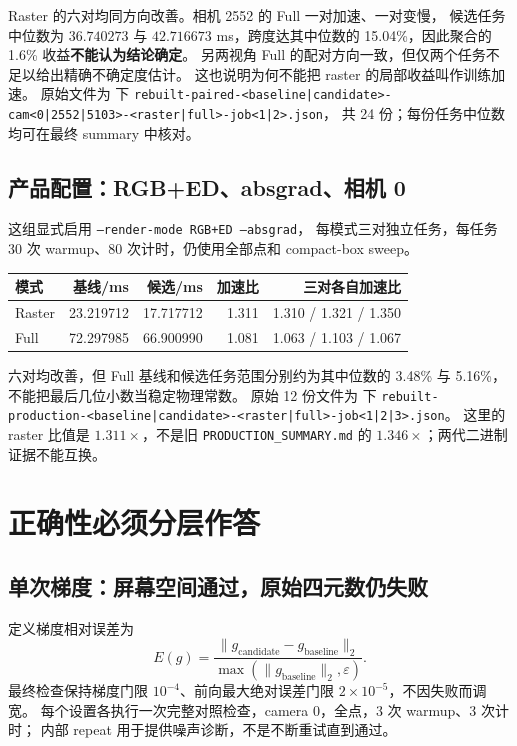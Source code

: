 Raster 的六对均同方向改善。相机 2552 的 Full 一对加速、一对变慢，
候选任务中位数为 \(36.740273\) 与 \(42.716673\) ms，跨度达其中位数的
15.04\%，因此聚合的 1.6\% 收益\textbf{不能认为结论确定}。
另两视角 Full 的配对方向一致，但仅两个任务不足以给出精确不确定度估计。
这也说明为何不能把 raster 的局部收益叫作训练加速。
原始文件为  下
\texttt{rebuilt-paired-<baseline|candidate>-cam<0|2552|5103>-<raster|full>-job<1|2>.json}，
共 24 份；每份任务中位数均可在最终 summary 中核对。

\subsection{产品配置：RGB+ED、absgrad、相机 0}

这组显式启用 \texttt{--render-mode RGB+ED --absgrad}，
每模式三对独立任务，每任务 30 次 warmup、80 次计时，仍使用全部点和 compact-box sweep。

\begin{center}
\small
\begin{tabular}{lrrrr}
\toprule
模式 & 基线/ms & 候选/ms & 加速比 & 三对各自加速比\\
\midrule
Raster & 23.219712 & 17.717712 & 1.311 & 1.310 / 1.321 / 1.350\\
Full   & 72.297985 & 66.900990 & 1.081 & 1.063 / 1.103 / 1.067\\
\bottomrule
\end{tabular}
\end{center}

六对均改善，但 Full 基线和候选任务范围分别约为其中位数的
3.48\% 与 5.16\%，不能把最后几位小数当稳定物理常数。
原始 12 份文件为  下
\texttt{rebuilt-production-<baseline|candidate>-<raster|full>-job<1|2|3>.json}。
这里的 raster 比值是 \(1.311\times\)，不是旧
\texttt{PRODUCTION\_SUMMARY.md} 的 \(1.346\times\)；两代二进制证据不能互换。

\section{正确性必须分层作答}

\subsection{单次梯度：屏幕空间通过，原始四元数仍失败}

定义梯度相对误差为
\[
 E(g)=\frac{\|g_{\mathrm{candidate}}-g_{\mathrm{baseline}}\|_2}
 {\max(\|g_{\mathrm{baseline}}\|_2,\varepsilon)}.
\]
最终检查保持梯度门限 \(10^{-4}\)、前向最大绝对误差门限
\(2\times10^{-5}\)，不因失败而调宽。
每个设置各执行一次完整对照检查，camera 0，全点，3 次 warmup、3 次计时；
内部 repeat 用于提供噪声诊断，不是不断重试直到通过。

